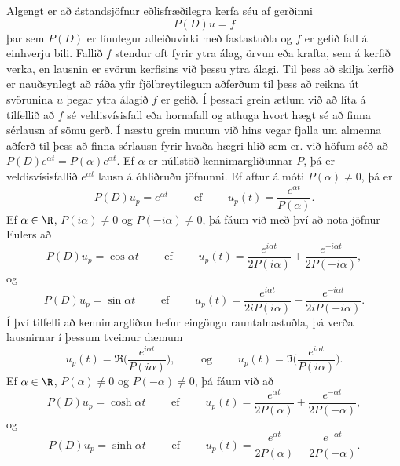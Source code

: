 \noindent
Algengt er að ástandsjöfnur eðlisfræðilegra kerfa séu af gerðinni
 $$P(D)u=f
 $$
þar sem $P(D)$ er línulegur afleiðuvirki með fastastuðla og $f$ er gefið
fall á einhverju bili.  Fallið $f$ stendur oft fyrir ytra álag, örvun
eða krafta, sem á kerfið verka, en lausnin er svörun kerfisins við
þessu ytra álagi.   Til þess að skilja kerfið er nauðsynlegt að ráða
yfir fjölbreytilegum aðferðum til þess að reikna út svörunina $u$
þegar ytra álagið $f$ er gefið.  Í þessari grein ætlum við að líta á
tilfellið að $f$ sé veldisvísisfall eða hornafall og athuga hvort hægt
sé að finna sérlausn af sömu gerð.  Í næstu grein munum við hins vegar
fjalla um almenna aðferð til þess að finna sérlausn fyrir hvaða hægri
hlið sem er.
við höfum séð að $P(D)e^{\alpha t}=P(\alpha)e^{\alpha t}$.  Ef
$\alpha$ er núllstöð
kennimargliðunnar $P$, þá er veldisvísisfallið $e^{\alpha t}$ lausn á
óhliðruðu jöfnunni.  Ef aftur á móti $P(\alpha) \neq 0$, þá er
\begin{equation*}
P(D)u_p=e^{\alpha t} \qquad\text{ ef } \qquad 
u_p(t)=\dfrac{e^{\alpha t}}{P(\alpha)}.\label{2.4.1}
\end{equation*}
Ef $\alpha\in \R$, $P(i\alpha)\neq 0$ og $P(-i\alpha)\neq 0$, þá fáum
við með því að nota jöfnur Eulers að
\begin{equation*}
P(D)u_p=\cos \alpha t \qquad\text{ ef } \qquad 
u_p(t)=
\dfrac{e^{i\alpha t}}{2P(i\alpha)}+
\dfrac{e^{-i\alpha t}}{2P(-i\alpha)},\label{2.4.2}
\end{equation*}
og
\begin{equation*}
P(D)u_p=\sin \alpha t \qquad\text{ ef } \qquad 
u_p(t)=\dfrac{e^{i\alpha t}}{2iP(i\alpha)}
-\dfrac{e^{-i\alpha t}}{2iP(-i\alpha)}.\label{2.4.3}
\end{equation*}
Í því tilfelli að kennimargliðan hefur eingöngu rauntalnastuðla, þá
verða lausnirnar í þessum tveimur dæmum
\begin{equation*}
u_p(t)=\Re \bigg(\dfrac{e^{i{\alpha}t}}{P(i{\alpha})}\bigg), \qquad
\text{ og } \qquad
u_p(t)=\Im \bigg(\dfrac{e^{i{\alpha}t}}{P(i{\alpha})}\bigg).\label{2.4.4}
\end{equation*}
Ef $\alpha\in \R$, $P(\alpha)\neq 0$ og $P(-\alpha)\neq 0$, þá fáum
við að 
\begin{equation*}
P(D)u_p=\cosh \alpha t \qquad\text{ ef }\qquad
u_p(t)=\dfrac{e^{\alpha t}}{2P(\alpha)}+\dfrac{e^{-\alpha
t}}{2P(-\alpha)},\label{2.4.5}
\end{equation*}
og
\begin{equation*}
P(D)u_p=\sinh \alpha t \qquad\text{ ef }\qquad
u_p(t)=\dfrac{e^{\alpha t}}{2P(\alpha)}-\dfrac{e^{-\alpha
t}}{2P(-\alpha)}.\label{2.4.6}
\end{equation*}



